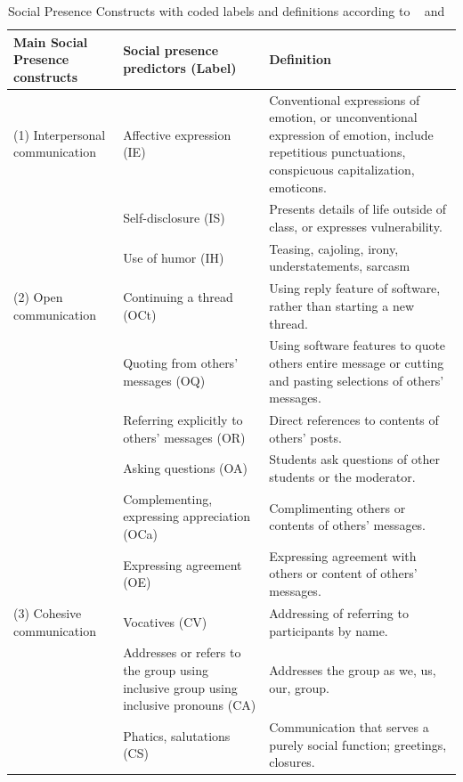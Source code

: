 \documentclass[manuscript,screen,review]{acmart}
\begin{document}
\begin{table}[h!]
\caption{Social Presence Constructs with coded labels and  definitions according to ~\cite{joksimovic2015social} and ~\cite{garrison2009communities}}
 \label{tab:Social}
\begin{center}
    \begin{tabular}{p{3cm}|p{4cm}|p{5cm}}
    \toprule
     \centering Main Social Presence constructs & \centering	Social presence predictors (Label) & Definition  \\
     \midrule
    (1)  Interpersonal communication  &  Affective expression (IE)  & Conventional expressions of emotion, or unconventional expression of emotion, include repetitious punctuations, conspicuous capitalization, emoticons.       
     \\ \hline
      & Self-disclosure (IS) & Presents details of life outside of class, or expresses vulnerability.
    \\ \hline
     & Use of humor (IH)  & Teasing, cajoling, irony, understatements, sarcasm
    \\ \hline
   (2) Open communication & Continuing a thread (OCt) & Using reply feature of software, rather than starting a new thread.
    \\ \hline
     & Quoting from others’ messages (OQ) & Using software features to quote others entire message or cutting and pasting selections of others' messages.
    \\ \hline
     & Referring explicitly to others’ messages (OR) & Direct references to contents of others' posts.
    \\ \hline
     & Asking questions (OA) & Students ask questions of other students or the moderator.
    \\ \hline
     & Complementing, expressing appreciation (OCa) & Complimenting others or contents of others' messages.
    \\ \hline
    & Expressing agreement (OE) & Expressing agreement with others or content of others' messages.
    \\ \hline
    (3) Cohesive communication & Vocatives (CV) & Addressing of referring to participants by name.
    \\ \hline
    & Addresses or refers to the group using inclusive group using inclusive pronouns (CA) & Addresses the group as we, us, our, group.
    \\ \hline
    & Phatics, salutations (CS) & Communication that serves a purely social function; greetings, closures.
    \\ \hline
    \end{tabular}
    \end{center}
    \end{table}
\end{document}
